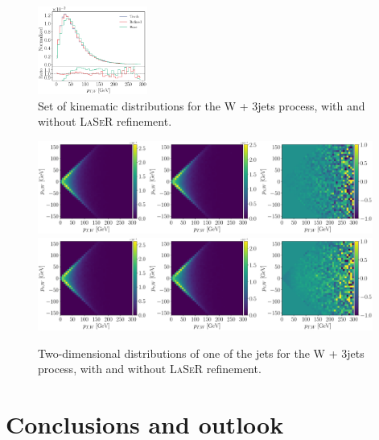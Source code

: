 \begin{figure}[H]
\includegraphics[width=0.32\textwidth, page=13]{./figures/wp_3j_HMC_ratio.pdf}
\caption{Set of kinematic distributions for the W + 3jets process, with and without \textsc{LaSeR} refinement.}
\label{fig:w_3jets_marginals}
\end{figure}
%
\begin{figure}[H]
\centering
\includegraphics[width=0.98\textwidth, page=50]{./figures/wp_3j_HMC_2d.pdf}\\
\includegraphics[width=0.98\textwidth, page=50]{./figures/wp_3j_epoch_500_target_2d.pdf}\\
\caption{Two-dimensional distributions of one of the jets for the W + 3jets process, with and without \textsc{LaSeR} refinement.}
\label{fig:w_3jets_2d}
\end{figure}
%

\section{Conclusions and outlook}
\label{sec:conclusion}

